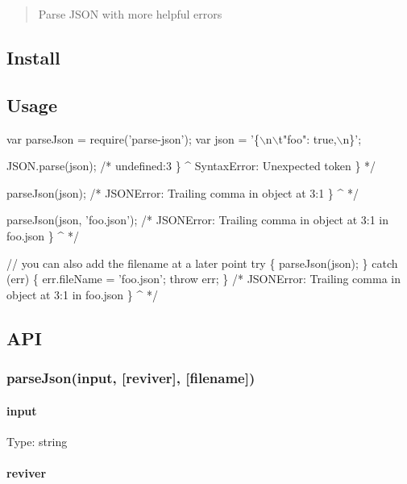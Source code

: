 \begin{quote}
Parse J\+S\+ON with more helpful errors \end{quote}


\subsection*{Install}




\subsection*{Usage}


\begin{DoxyCode}
var parseJson = require('parse-json');
var json = '\{\(\backslash\)n\(\backslash\)t"foo": true,\(\backslash\)n\}';


JSON.parse(json);
/*
undefined:3
\}
^
SyntaxError: Unexpected token \}
*/


parseJson(json);
/*
JSONError: Trailing comma in object at 3:1
\}
^
*/


parseJson(json, 'foo.json');
/*
JSONError: Trailing comma in object at 3:1 in foo.json
\}
^
*/


// you can also add the filename at a later point
try \{
    parseJson(json);
\} catch (err) \{
    err.fileName = 'foo.json';
    throw err;
\}
/*
JSONError: Trailing comma in object at 3:1 in foo.json
\}
^
*/
\end{DoxyCode}


\subsection*{A\+PI}

\subsubsection*{parse\+Json(input, \mbox{[}reviver\mbox{]}, \mbox{[}filename\mbox{]})}

\paragraph*{input}

Type\+: {\ttfamily string}

\paragraph*{reviver}

